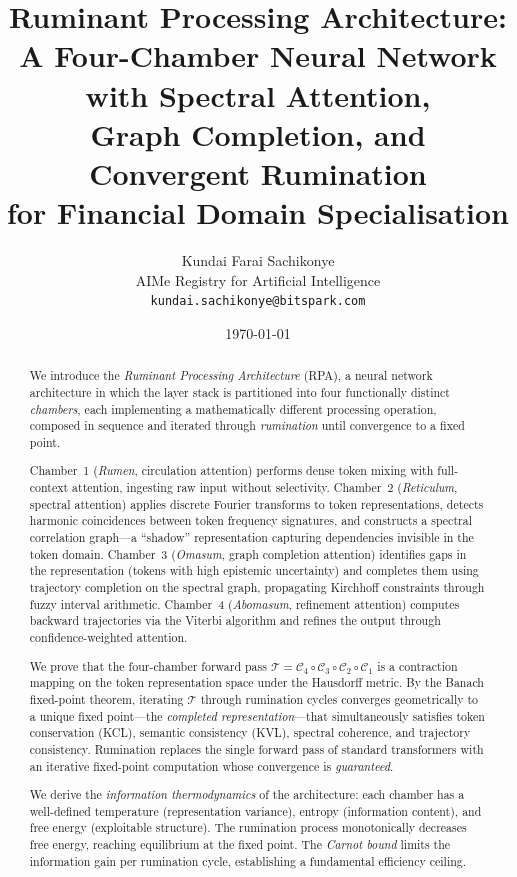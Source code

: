 \documentclass[twocolumn,10pt]{article}
\title{Ruminant Processing Architecture:\\
A Four-Chamber Neural Network with Spectral Attention,\\
Graph Completion, and Convergent Rumination\\
for Financial Domain Specialisation}
\author{
    Kundai Farai Sachikonye\\
    AIMe Registry for Artificial Intelligence\\
    \texttt{kundai.sachikonye@bitspark.com}
}
\date{\today}
\theoremstyle{remark}
\newcommand{\Tcomp}{\mathcal{T}}
\newcommand{\chamber}[1]{\mathcal{C}_{#1}}
\begin{document}
\maketitle

\begin{abstract}
We introduce the \emph{Ruminant Processing Architecture} (RPA), a neural network architecture in which the layer stack is partitioned into four functionally distinct \emph{chambers}, each implementing a mathematically different processing operation, composed in sequence and iterated through \emph{rumination} until convergence to a fixed point.

Chamber~1 (\emph{Rumen}, circulation attention) performs dense token mixing with full-context attention, ingesting raw input without selectivity.  Chamber~2 (\emph{Reticulum}, spectral attention) applies discrete Fourier transforms to token representations, detects harmonic coincidences between token frequency signatures, and constructs a spectral correlation graph---a ``shadow'' representation capturing dependencies invisible in the token domain.  Chamber~3 (\emph{Omasum}, graph completion attention) identifies gaps in the representation (tokens with high epistemic uncertainty) and completes them using trajectory completion on the spectral graph, propagating Kirchhoff constraints through fuzzy interval arithmetic.  Chamber~4 (\emph{Abomasum}, refinement attention) computes backward trajectories via the Viterbi algorithm and refines the output through confidence-weighted attention.

We prove that the four-chamber forward pass $\Tcomp = \chamber{4} \circ \chamber{3} \circ \chamber{2} \circ \chamber{1}$ is a contraction mapping on the token representation space under the Hausdorff metric.  By the Banach fixed-point theorem, iterating $\Tcomp$ through rumination cycles converges geometrically to a unique fixed point---the \emph{completed representation}---that simultaneously satisfies token conservation (KCL), semantic consistency (KVL), spectral coherence, and trajectory consistency.  Rumination replaces the single forward pass of standard transformers with an iterative fixed-point computation whose convergence is \emph{guaranteed}.

We derive the \emph{information thermodynamics} of the architecture: each chamber has a well-defined temperature (representation variance), entropy (information content), and free energy (exploitable structure).  The rumination process monotonically decreases free energy, reaching equilibrium at the fixed point.  The \emph{Carnot bound} limits the information gain per rumination cycle, establishing a fundamental efficiency ceiling.


\end{abstract}
\end{document}

